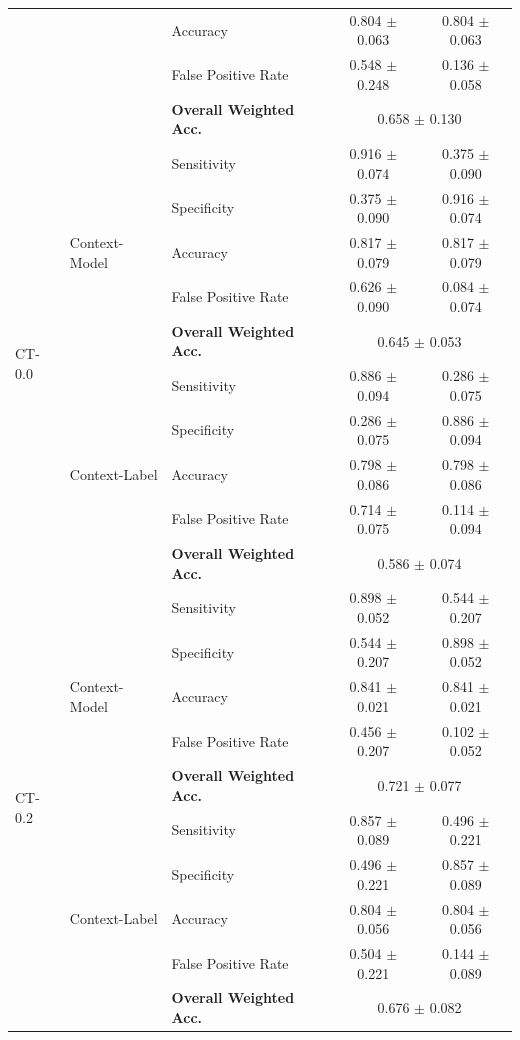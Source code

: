 \begin{table}[ht]
\begin{tabular}{l|llcc}
  &   & Accuracy               & 0.804 $\pm$ 0.063 & 0.804 $\pm$ 0.063 \\
  &   & False Positive Rate    & 0.548 $\pm$ 0.248 & 0.136 $\pm$ 0.058 \\
  &   & \textbf{Overall Weighted Acc.}
                                & \multicolumn{2}{c}{0.658 $\pm$ 0.130} \\ \midrule
\multirow{10}{*}{CT-0.0}
  & \multirow{5}{*}{Context-Model}
      & Sensitivity            & 0.916 $\pm$ 0.074 & 0.375 $\pm$ 0.090 \\
  &   & Specificity            & 0.375 $\pm$ 0.090 & 0.916 $\pm$ 0.074 \\
  &   & Accuracy               & 0.817 $\pm$ 0.079 & 0.817 $\pm$ 0.079 \\
  &   & False Positive Rate    & 0.626 $\pm$ 0.090 & 0.084 $\pm$ 0.074 \\
  &   & \textbf{Overall Weighted Acc.}
                                & \multicolumn{2}{c}{0.645 $\pm$ 0.053} \\ \cmidrule{2-5}
  & \multirow{5}{*}{Context-Label}
      & Sensitivity            & 0.886 $\pm$ 0.094 & 0.286 $\pm$ 0.075 \\
  &   & Specificity            & 0.286 $\pm$ 0.075 & 0.886 $\pm$ 0.094 \\
  &   & Accuracy               & 0.798 $\pm$ 0.086 & 0.798 $\pm$ 0.086 \\
  &   & False Positive Rate    & 0.714 $\pm$ 0.075 & 0.114 $\pm$ 0.094 \\
  &   & \textbf{Overall Weighted Acc.}
                                & \multicolumn{2}{c}{0.586 $\pm$ 0.074} \\ \midrule
\multirow{10}{*}{CT-0.2}
  & \multirow{5}{*}{Context-Model}
      & Sensitivity            & 0.898 $\pm$ 0.052 & 0.544 $\pm$ 0.207 \\
  &   & Specificity            & 0.544 $\pm$ 0.207 & 0.898 $\pm$ 0.052 \\
  &   & Accuracy               & 0.841 $\pm$ 0.021 & 0.841 $\pm$ 0.021 \\
  &   & False Positive Rate    & 0.456 $\pm$ 0.207 & 0.102 $\pm$ 0.052 \\
  &   & \textbf{Overall Weighted Acc.}
                                & \multicolumn{2}{c}{0.721 $\pm$ 0.077} \\ \cmidrule{2-5}
  & \multirow{5}{*}{Context-Label}
      & Sensitivity            & 0.857 $\pm$ 0.089 & 0.496 $\pm$ 0.221 \\
  &   & Specificity            & 0.496 $\pm$ 0.221 & 0.857 $\pm$ 0.089 \\
  &   & Accuracy               & 0.804 $\pm$ 0.056 & 0.804 $\pm$ 0.056 \\
  &   & False Positive Rate    & 0.504 $\pm$ 0.221 & 0.144 $\pm$ 0.089 \\
  &   & \textbf{Overall Weighted Acc.}
                                & \multicolumn{2}{c}{0.676 $\pm$ 0.082} \\ \midrule


\end{tabular}
\end{table}
